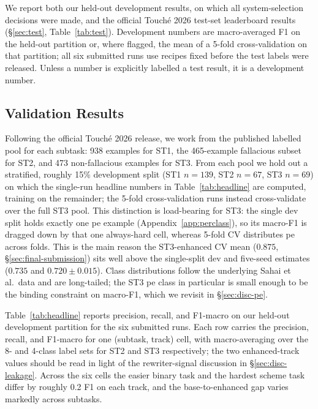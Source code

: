 We report both our held-out development results, on which all system-selection decisions were made, and the official Touch\'{e} 2026 test-set leaderboard results (\S\ref{sec:test}, Table~\ref{tab:test}). Development numbers are macro-averaged F1 on the held-out partition or, where flagged, the mean of a 5-fold cross-validation on that partition; all six submitted runs use recipes fixed before the test labels were released. Unless a number is explicitly labelled a test result, it is a development number.

\subsection{Validation Results}
\label{sec:headline}

Following the official Touch\'{e} 2026 release, we work from the published labelled pool for each subtask: 938 examples for ST1, the 465-example fallacious subset for ST2, and 473 non-fallacious examples for ST3. %
From each pool we hold out a stratified, roughly 15\% development split (ST1 $n=139$, ST2 $n=67$, ST3 $n=69$) on which the single-run headline numbers in Table~\ref{tab:headline} are computed, training on the remainder; the 5-fold cross-validation runs instead cross-validate over the full ST3 pool. This distinction is load-bearing for ST3: the single dev split holds exactly one \textsf{pe} example (Appendix~\ref{app:perclass}), so its macro-F1 is dragged down by that one always-hard cell, whereas 5-fold CV distributes \textsf{pe} across folds. This is the main reason the ST3-enhanced CV mean ($0.875$, \S\ref{sec:final-submission}) sits well above the single-split dev and five-seed estimates ($0.735$ and $0.720 \pm 0.015$). %
Class distributions follow the underlying Sahai et al.\ data and are long-tailed; the ST3 \textsf{pe} class in particular is small enough to be the binding constraint on macro-F1, which we revisit in \S\ref{sec:disc-pe}.

Table~\ref{tab:headline} reports precision, recall, and F1-macro on our held-out development partition for the six submitted runs. Each row carries the precision, recall, and F1-macro for one (subtask, track) cell, with macro-averaging over the 8- and 4-class label sets for ST2 and ST3 respectively; the two enhanced-track values should be read in light of the rewriter-signal discussion in \S\ref{sec:disc-leakage}. %
Across the six cells the easier binary task and the hardest scheme task differ by roughly 0.2 F1 on each track, and the base-to-enhanced gap varies markedly across subtasks.

